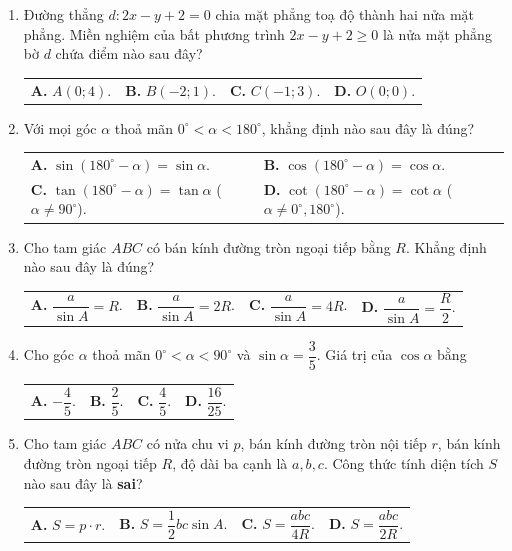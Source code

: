 \documentclass[12pt,a4paper]{article}
\makeatletter
\newcommand{\four}[4]{\par\noindent\begin{tabularx}{\linewidth}{@{}*{4}{>{\raggedright\arraybackslash}X}@{}}\textbf{A.} #1&\textbf{B.} #2&\textbf{C.} #3&\textbf{D.} #4\end{tabularx}}
\newcommand{\two}[4]{\par\noindent\begin{tabularx}{\linewidth}{@{}*{2}{>{\raggedright\arraybackslash}X}@{}}\textbf{A.} #1&\textbf{B.} #2\\[1pt]\textbf{C.} #3&\textbf{D.} #4\end{tabularx}}
\makeatother
\begin{document}
\begin{enumerate}
\item Đường thẳng $d\colon 2x - y + 2 = 0$ chia mặt phẳng toạ độ thành hai nửa mặt phẳng. Miền nghiệm của bất phương trình $2x - y + 2 \ge 0$ là nửa mặt phẳng bờ $d$ chứa điểm nào sau đây?
\four{$A(0; 4)$.}{$B(-2; 1)$.}{$C(-1; 3)$.}{$O(0; 0)$.}

\item Với mọi góc $\alpha$ thoả mãn $0^\circ < \alpha < 180^\circ$, khẳng định nào sau đây là đúng?
\two{$\sin(180^\circ - \alpha) = \sin \alpha$.}{$\cos(180^\circ - \alpha) = \cos \alpha$.}{$\tan(180^\circ - \alpha) = \tan \alpha$ ($\alpha \ne 90^\circ$).}{$\cot(180^\circ - \alpha) = \cot \alpha$ ($\alpha \ne 0^\circ, 180^\circ$).}

\item Cho tam giác $ABC$ có bán kính đường tròn ngoại tiếp bằng $R$. Khẳng định nào sau đây là đúng?
\four{$\dfrac{a}{\sin A} = R$.}{$\dfrac{a}{\sin A} = 2R$.}{$\dfrac{a}{\sin A} = 4R$.}{$\dfrac{a}{\sin A} = \dfrac{R}{2}$.}

\item Cho góc $\alpha$ thoả mãn $0^\circ < \alpha < 90^\circ$ và $\sin \alpha = \dfrac{3}{5}$. Giá trị của $\cos \alpha$ bằng
\four{$-\dfrac{4}{5}$.}{$\dfrac{2}{5}$.}{$\dfrac{4}{5}$.}{$\dfrac{16}{25}$.}

\item Cho tam giác $ABC$ có nửa chu vi $p$, bán kính đường tròn nội tiếp $r$, bán kính đường tròn ngoại tiếp $R$, độ dài ba cạnh là $a, b, c$. Công thức tính diện tích $S$ nào sau đây là \textbf{sai}?
\four{$S = p \cdot r$.}{$S = \dfrac{1}{2}bc \sin A$.}{$S = \dfrac{abc}{4R}$.}{$S = \dfrac{abc}{2R}$.}
\end{enumerate}
\newpage
\end{document}
